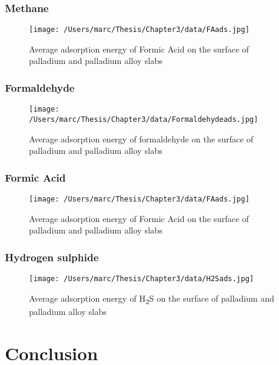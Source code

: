 \subsubsection{Methane}
\begin{landscape}
  \begin{figure}
      \centering
      \texttt{[image: /Users/marc/Thesis/Chapter3/data/FAads.jpg]}
      \caption{Average adsorption energy of Formic Acid on the surface of palladium and palladium alloy slabs}
      \label{CH4ads}
    \end{figure}
  
  \end{landscape}
\subsubsection{Formaldehyde}
\begin{landscape}
  \begin{figure}
      \centering
      \texttt{[image: /Users/marc/Thesis/Chapter3/data/Formaldehydeads.jpg]}
      \caption{Average adsorption energy of formaldehyde on the surface of palladium and palladium alloy slabs}
      \label{formaldehydeads}
    \end{figure}
  
  \end{landscape}

\subsubsection{Formic Acid}

\begin{landscape}
  \begin{figure}
      \centering
      \texttt{[image: /Users/marc/Thesis/Chapter3/data/FAads.jpg]}
      \caption{Average adsorption energy of Formic Acid on the surface of palladium and palladium alloy slabs}
      \label{FAads}
    \end{figure}
  
  \end{landscape}
\subsubsection{Hydrogen sulphide}
\begin{landscape}

\begin{figure}
    \centering
    \texttt{[image: /Users/marc/Thesis/Chapter3/data/H2Sads.jpg]}
    \caption{Average adsorption energy of H\textsubscript{2}S on the surface of palladium and palladium alloy slabs}
    \label{h2sads}
  \end{figure}
\end{landscape}


\section{Conclusion}

